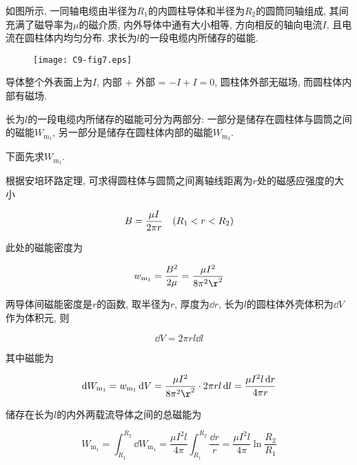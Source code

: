 \begin{example}
	如图所示, 一同轴电缆由半径为$R_1$的内圆柱导体和半径为$R_2$的圆筒同轴组成, 其间充满了磁导率为$\mu$的磁介质, 内外导体中通有大小相等, 方向相反的轴向电流$I$, 且电流在圆柱体内均匀分布. 求长为$l$的一段电缆内所储存的磁能. 
	
	\begin{figure}[H]
		\centering
		\texttt{[image: C9-fig7.eps]}
	\end{figure}
	
	\begin{solution}
		
		导体整个外表面上为$I$, 内部 + 外部 = $-I+I = 0$, 圆柱体外部无磁场, 而圆柱体内部有磁场. 
		
		长为$l$的一段电缆内所储存的磁能可分为两部分: 一部分是储存在圆柱体与圆筒之间的磁能$W_{\textrm{m}_1}$, 另一部分是储存在圆柱体内部的磁能$W_{\textrm{m}_2}$. 
		
		下面先求$W_{\textrm{m}_1}$. 
		
		根据安培环路定理, 可求得圆柱体与圆筒之间离轴线距离为$r$处的磁感应强度的大小
		
		\begin{equation*}
			B = \dfrac{\mu I}{2 \pi r} \quad \qty(R_1 < r < R_2)
		\end{equation*}
		
		此处的磁能密度为
		
		\begin{equation*}
			w_{\textrm{m}_1} = \dfrac{B^2}{2 \mu} = \dfrac{\mu I^2}{8 \pi^2 \r^2}
		\end{equation*}
	
		两导体间磁能密度是$r$的函数, 取半径为$r$, 厚度为$\dd{r}$, 长为$l$的圆柱体外壳体积为$\dd{V}$作为体积元, 则
		
		\begin{equation*}
			\dd{V} = 2 \pi r l \dd{l}
		\end{equation*}
		
		其中磁能为
		
		\begin{equation*}
			\dd{W_{\textrm{m}_1}} = w_{\textrm{m}_1} \dd{V} = \dfrac{\mu I^2}{8 \pi^2 \r^2} \cdot 2 \pi r l \dd{l} = \dfrac{\mu I^2 l \dd{r}}{4 \pi r}
		\end{equation*}
		
		储存在长为$l$的内外两载流导体之间的总磁能为
		
		\begin{equation*}
			W_{\textrm{m}_1} = \int_{R_1}^{R_2} \dd{W_{\textrm{m}_1}} = \dfrac{\mu I^2 l}{4 \pi} \int_{R_1}^{R_2} \dfrac{\dd{r}}{r} = \dfrac{\mu I^2 l}{4 \pi} \ln \dfrac{R_2}{R_1}
		\end{equation*}
		

\end{solution}
\end{example}
